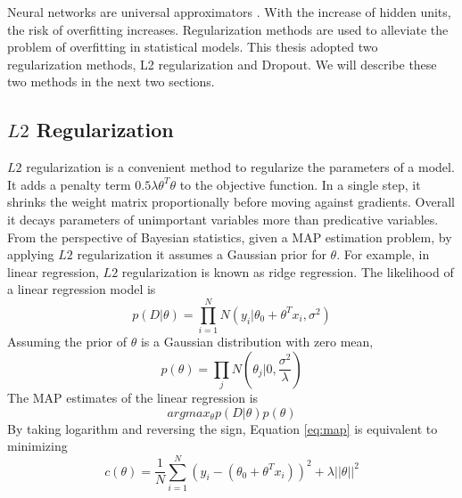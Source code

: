 Neural networks are universal approximators \cite{hornik1989}. With the increase of hidden units, the risk of overfitting increases. Regularization methods are used to alleviate the problem of overfitting in statistical models. This thesis adopted two regularization methods, L2 regularization and Dropout. We will describe these two methods in the next two sections.
\subsection{$L2$ Regularization}
\label{subsec:L2 norm}
$L2$ regularization is a convenient method to regularize the parameters of a model. It adds a penalty term $0.5\lambda \theta^T\theta$ to the objective function. In a single step, it shrinks the weight matrix proportionally before moving against gradients. Overall it decays parameters of unimportant variables more than predicative variables. From the perspective of Bayesian statistics, given a MAP estimation problem, by applying $L2$ regularization it assumes a Gaussian prior for $\theta$. For example, in linear regression, $L2$ regularization is known as ridge regression. The likelihood of a linear regression model is 
\begin{equation}
p(D|\theta)=\prod_{i=1}^{N} N(y_i|\theta_0+\theta^Tx_i,\sigma^2)
\end{equation}
Assuming the prior of $\theta$ is a Gaussian distribution with zero mean,
\begin{equation}
p(\theta)=\prod_j N(\theta_j|0,\frac{\sigma^2}{\lambda})
\end{equation}
The MAP estimates of the linear regression is 
\begin{equation}
\label{eq:map}
argmax_\theta p(D|\theta)p(\theta)
\end{equation}
By taking logarithm and reversing the sign, Equation \ref{eq:map} is equivalent to minimizing 
\begin{equation}
c(\theta)=\frac{1}{N}\sum_{i=1}^N(y_i-(\theta_0+\theta^T x_i))^2+\lambda||\theta||^2
\end{equation}

